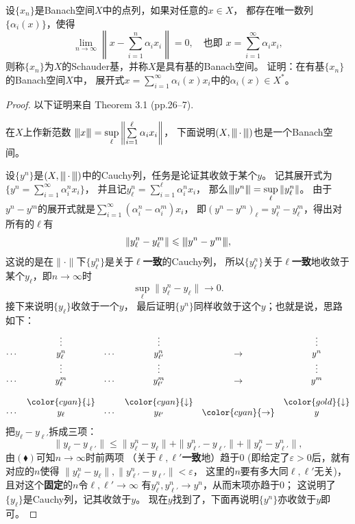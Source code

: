 \begin{8}
    设$\{x_n\}$是Banach空间$X$中的点列，如果对任意的$x\in X$，
    都存在唯一数列$\{\alpha_i(x)\}$，使得
    $$\lim_{n\to\infty}\left\|x-\sum_{i=1}^n\alpha_ix_i\right\|=0,
    \quad\text{也即 }x=\sum_{i=1}^\infty\alpha_ix_i,$$
    则称$\{x_n\}$为$X$的Schauder基，并称$X$是具有基的Banach空间。
    证明：在有基$\{x_n\}$的Banach空间$X$中，
    展开式$x=\sum\limits_{i=1}^\infty\alpha_i(x)x_i$中的$\alpha_i(x)\in X^*$。
\end{8}
\begin{proof}
    以下证明来自\cite{Ca} Theorem 3.1 (pp.26--7).
    
    在$X$上作新范数
    ${\left\vert\kern-0.25ex\left\vert\kern-0.25ex\left\vert x \right\vert\kern-0.25ex\right\vert\kern-0.25ex\right\vert}=\sup\limits_\ell\left\|\sum\limits_{i=1}^\ell\alpha_ix_i\right\|$，
    下面说明$(X,{\left\vert\kern-0.25ex\left\vert\kern-0.25ex\left\vert \,\cdot\, \right\vert\kern-0.25ex\right\vert\kern-0.25ex\right\vert})$也是一个Banach空间。
    
    设$\{y^n\}$是$(X,{\left\vert\kern-0.25ex\left\vert\kern-0.25ex\left\vert \,\cdot\, \right\vert\kern-0.25ex\right\vert\kern-0.25ex\right\vert})$中的Cauchy列，任务是论证其收敛于某个$y$。
    记其展开式为$\Big\{y^n=\sum\limits_{i=1}^\infty\alpha_i^{n}x_i\Big\}$，
    并且记$y^n_\ell=\sum\limits_{i=1}^\ell\alpha_i^{n}x_i$，
    那么${\left\vert\kern-0.25ex\left\vert\kern-0.25ex\left\vert y^n \right\vert\kern-0.25ex\right\vert\kern-0.25ex\right\vert}=\sup\limits_\ell\|y^n_\ell\|$。
    由于$y^n-y^m$的展开式就是$\sum\limits_{i=1}^\infty(\alpha_i^n-\alpha_i^m)x_i$，
    即$(y^n-y^m)_\ell=y^n_\ell-y^m_\ell$，得出对所有的$\ell$有
    \[\|y^n_\ell-y^m_\ell\|\leqslant{\left\vert\kern-0.25ex\left\vert\kern-0.25ex\left\vert y^n-y^m \right\vert\kern-0.25ex\right\vert\kern-0.25ex\right\vert},\]
    这说的是在$\|\cdot\|$下$\{y^n_\ell\}$是关于$\ell$\textbf{一致}的Cauchy列，
    所以$\{y^n_\ell\}$关于$\ell$\textbf{一致}地收敛于某个$y_\ell$，即$n\to\infty$时
    \[\sup_\ell\|y^n_\ell-y_\ell\|\to0.\tag{$\blacklozenge$}\]
    接下来说明$\{y_\ell\}$收敛于一个$y$，
    最后证明$\{y^n\}$同样收敛于这个$y$；也就是说，思路如下：
    \[\begin{matrix}
              &\vdots  &      &\vdots     &   &\vdots\\
        \cdots&y^n_\ell&\cdots&y^n_{\ell'}&\to&y^n   \\
              &\vdots  &      &\vdots     &   &\vdots\\
        \cdots&y^m_\ell&\cdots&y^m_{\ell'}&\to&y^m   \\
              &        &      &           &   &      \\
        &\color{cyan}{\downarrow}& &\color{cyan}{\downarrow}& &\color{gold}{\downarrow}\\
        \cdots&y_\ell  &\cdots&y_{\ell'}  &\color{cyan}{\to}&y
    \end{matrix}\]
    把$y_\ell-y_{\ell'}$拆成三项：
    \[\|y_\ell-y_{\ell'}\|\leqslant\|y^n_\ell-y_\ell\|
    +\|y^n_{\ell'}-y_{\ell'}\|+\|y^n_\ell-y^n_{\ell'}\|,\]
    由$(\blacklozenge)$可知$n\to\infty$时前两项
    （关于$\ell,\ell'$\textbf{一致}地）趋于$0$
    (即给定了$\varepsilon>0$后，就有对应的$n$使得
    $\|y^n_\ell-y_\ell\|,\|y^n_{\ell'}-y_{\ell'}\|<\varepsilon$，
    这里的$n$要有多大同$\ell,\ell'$无关)，
    且对这个\textbf{固定}的$n$令$\ell,\ell'\to\infty$
    有$y^n_\ell,y^n_{\ell'} \to y^n$，从而末项亦趋于$0$；
    这说明了$\{y_\ell\}$是Cauchy列，记其收敛于$y$。
    现在$y$找到了，下面再说明$\{y^n\}$亦收敛于$y$即可。


\end{proof}
